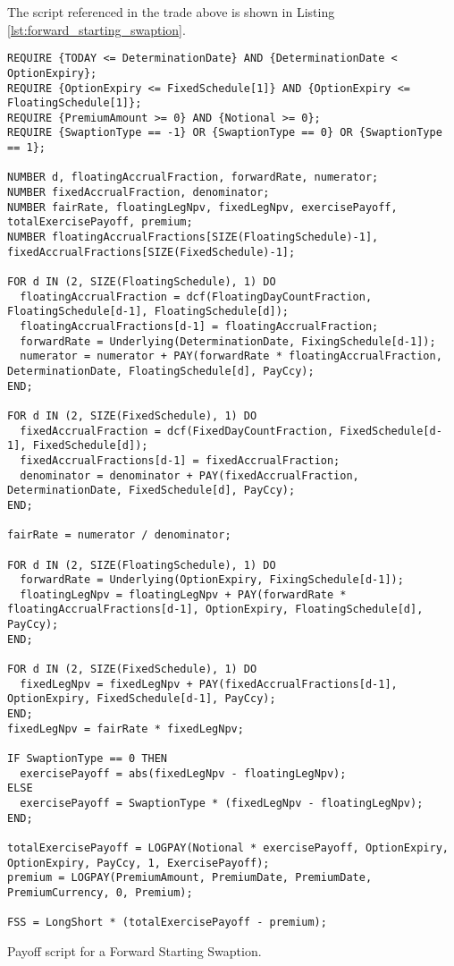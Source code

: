 The script referenced in the trade above is shown in Listing \ref{lst:forward_starting_swaption}.
 
\begin{listing}[hbt] 
\begin{verbatim} 
REQUIRE {TODAY <= DeterminationDate} AND {DeterminationDate < OptionExpiry};
REQUIRE {OptionExpiry <= FixedSchedule[1]} AND {OptionExpiry <= FloatingSchedule[1]};
REQUIRE {PremiumAmount >= 0} AND {Notional >= 0};
REQUIRE {SwaptionType == -1} OR {SwaptionType == 0} OR {SwaptionType == 1};

NUMBER d, floatingAccrualFraction, forwardRate, numerator;
NUMBER fixedAccrualFraction, denominator;
NUMBER fairRate, floatingLegNpv, fixedLegNpv, exercisePayoff, totalExercisePayoff, premium;
NUMBER floatingAccrualFractions[SIZE(FloatingSchedule)-1], fixedAccrualFractions[SIZE(FixedSchedule)-1];

FOR d IN (2, SIZE(FloatingSchedule), 1) DO
  floatingAccrualFraction = dcf(FloatingDayCountFraction, FloatingSchedule[d-1], FloatingSchedule[d]);
  floatingAccrualFractions[d-1] = floatingAccrualFraction;
  forwardRate = Underlying(DeterminationDate, FixingSchedule[d-1]);
  numerator = numerator + PAY(forwardRate * floatingAccrualFraction, DeterminationDate, FloatingSchedule[d], PayCcy);
END;

FOR d IN (2, SIZE(FixedSchedule), 1) DO
  fixedAccrualFraction = dcf(FixedDayCountFraction, FixedSchedule[d-1], FixedSchedule[d]);
  fixedAccrualFractions[d-1] = fixedAccrualFraction;
  denominator = denominator + PAY(fixedAccrualFraction, DeterminationDate, FixedSchedule[d], PayCcy);
END;

fairRate = numerator / denominator;

FOR d IN (2, SIZE(FloatingSchedule), 1) DO
  forwardRate = Underlying(OptionExpiry, FixingSchedule[d-1]);
  floatingLegNpv = floatingLegNpv + PAY(forwardRate * floatingAccrualFractions[d-1], OptionExpiry, FloatingSchedule[d], PayCcy);
END;

FOR d IN (2, SIZE(FixedSchedule), 1) DO
  fixedLegNpv = fixedLegNpv + PAY(fixedAccrualFractions[d-1], OptionExpiry, FixedSchedule[d-1], PayCcy);
END;
fixedLegNpv = fairRate * fixedLegNpv;

IF SwaptionType == 0 THEN
  exercisePayoff = abs(fixedLegNpv - floatingLegNpv);
ELSE
  exercisePayoff = SwaptionType * (fixedLegNpv - floatingLegNpv);
END;

totalExercisePayoff = LOGPAY(Notional * exercisePayoff, OptionExpiry, OptionExpiry, PayCcy, 1, ExercisePayoff);
premium = LOGPAY(PremiumAmount, PremiumDate, PremiumDate, PremiumCurrency, 0, Premium);

FSS = LongShort * (totalExercisePayoff - premium);
\end{verbatim} 
\caption{Payoff script for a Forward Starting Swaption.} 
\label{lst:forward_starting_swaption} 
\end{listing} 
 
